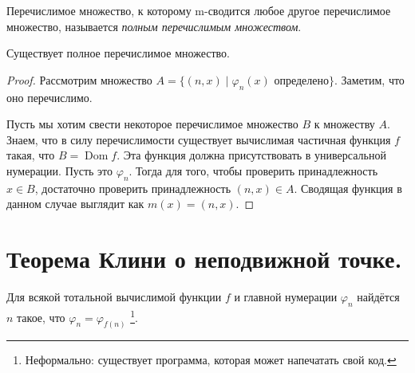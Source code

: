 \documentclass{article}
\begin{document}
    \begin{definition}
        Перечислимое множество, к которому m-сводится любое другое перечислимое множество, называется
        \textit{полным перечислимым множеством}.
    \end{definition}
    \begin{theorem}
        Существует полное перечислимое множество.
    \end{theorem}
    \begin{proof}
        Рассмотрим множество $A = \{(n, x) \mid \varphi_n(x) \text{ определено}\}$. Заметим, что оно
        перечислимо.

        Пусть мы хотим свести некоторое перечислимое множество $B$ к множеству $A$. Знаем, что
        в силу перечислимости существует вычислимая частичная функция $f$ такая, что $B
        = \operatorname{Dom} f$. Эта функция должна присутствовать в универсальной нумерации. Пусть
        это $\varphi_n$. Тогда для того, чтобы проверить принадлежность $x \in B$, достаточно проверить
        принадлежность $(n, x) \in A$. Сводящая функция в данном случае выглядит как $m(x) = (n,
        x)$.
    \end{proof}

    \section{Теорема Клини о неподвижной точке.}

    \begin{theorem}
        Для всякой тотальной вычислимой функции $f$ и главной нумерации $\varphi_n$ найдётся $n$
        такое, что $\varphi_n = \varphi_{f(n)}$ \footnote{Неформально: существует программа, которая
        может напечатать свой код.}.
    \end{theorem}
\end{document}
